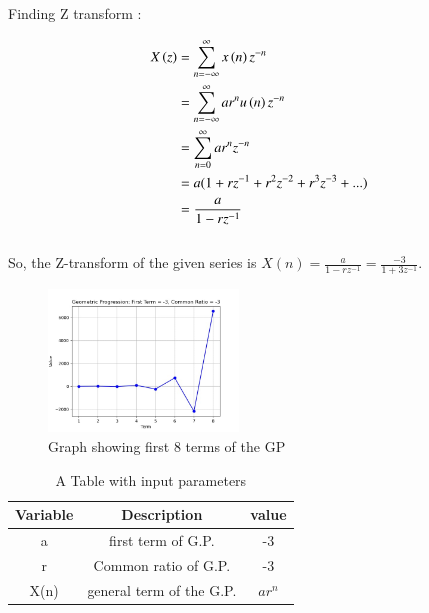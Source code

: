 \documentclass[journal,12pt,twocolumn]{IEEEtran}
\begin{document}
Finding Z transform : 

\begin{align}
    X \left(z\right) & = \sum_{n=-\infty}^{\infty} x \left(n\right)   z^{-n} \\
    & = \sum_{n=-\infty}^{\infty} ar^n  u \left(n\right)   z^{-n} \\
    & = \sum_{n=0}^{\infty} ar^n  z^{-n} \\
    & = a( 1 + rz^{-1} + r^{2}z^{-2} + r^{3}z^{-3} +...)\\
    & = \frac{a}{{1 - rz^{-1}}} 
\end{align}
\hspace{3cm} \\
So, the Z-transform of the given series is
$X(n)=\frac{a}{1-rz^{-1}}= \frac{-3}{1+3z^{-1}}$.\\
\begin{figure}[ht]
        \centering
        \includegraphics[width=0.45\textwidth]{graph.jpeg}
        \centering
        \caption{    Graph showing first 8 terms of the GP}
    \end{figure} 
    
\begin{table}[ht]
  \centering
  \begin{tabular}{|c|c|c|}
    \hline
    \textbf{Variable} & \textbf{Description} & \textbf{value}\\
    \hline
    a & first term of G.P. & -3 \\
    \hline
    r & Common ratio of G.P. & -3 \\
    \hline
    X(n) & general term of the G.P. & $ar^{n}$ \\
    \hline
  \end{tabular}
  \caption{A Table with input parameters}
  \label{tab:1}
\end{table}
\end{document}
